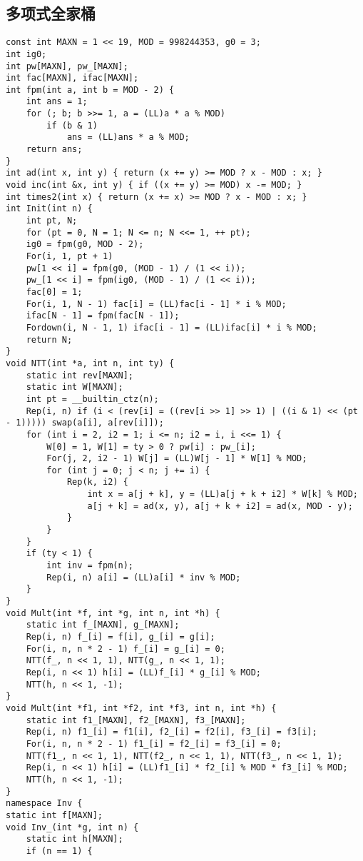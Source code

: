 \documentclass[twocolumn,a4]{article}
\begin{document}
\subsection{多项式全家桶}
\begin{lstlisting}
const int MAXN = 1 << 19, MOD = 998244353, g0 = 3;
int ig0;
int pw[MAXN], pw_[MAXN];
int fac[MAXN], ifac[MAXN];
int fpm(int a, int b = MOD - 2) {
    int ans = 1;
    for (; b; b >>= 1, a = (LL)a * a % MOD)
        if (b & 1)
            ans = (LL)ans * a % MOD;
    return ans;
}
int ad(int x, int y) { return (x += y) >= MOD ? x - MOD : x; }
void inc(int &x, int y) { if ((x += y) >= MOD) x -= MOD; }
int times2(int x) { return (x += x) >= MOD ? x - MOD : x; }
int Init(int n) {
    int pt, N;
    for (pt = 0, N = 1; N <= n; N <<= 1, ++ pt);
    ig0 = fpm(g0, MOD - 2);
    For(i, 1, pt + 1)
    pw[1 << i] = fpm(g0, (MOD - 1) / (1 << i));
	pw_[1 << i] = fpm(ig0, (MOD - 1) / (1 << i));
    fac[0] = 1;
    For(i, 1, N - 1) fac[i] = (LL)fac[i - 1] * i % MOD;
    ifac[N - 1] = fpm(fac[N - 1]);
    Fordown(i, N - 1, 1) ifac[i - 1] = (LL)ifac[i] * i % MOD;
    return N;
}
void NTT(int *a, int n, int ty) {
    static int rev[MAXN];
    static int W[MAXN];
    int pt = __builtin_ctz(n);
    Rep(i, n) if (i < (rev[i] = ((rev[i >> 1] >> 1) | ((i & 1) << (pt - 1))))) swap(a[i], a[rev[i]]);
    for (int i = 2, i2 = 1; i <= n; i2 = i, i <<= 1) {
        W[0] = 1, W[1] = ty > 0 ? pw[i] : pw_[i];
        For(j, 2, i2 - 1) W[j] = (LL)W[j - 1] * W[1] % MOD;
        for (int j = 0; j < n; j += i) {
            Rep(k, i2) {
                int x = a[j + k], y = (LL)a[j + k + i2] * W[k] % MOD;
                a[j + k] = ad(x, y), a[j + k + i2] = ad(x, MOD - y);
            }
        }
    }
    if (ty < 1) {
        int inv = fpm(n);
        Rep(i, n) a[i] = (LL)a[i] * inv % MOD;
    }
}
void Mult(int *f, int *g, int n, int *h) {
    static int f_[MAXN], g_[MAXN];
    Rep(i, n) f_[i] = f[i], g_[i] = g[i];
    For(i, n, n * 2 - 1) f_[i] = g_[i] = 0;
    NTT(f_, n << 1, 1), NTT(g_, n << 1, 1);
    Rep(i, n << 1) h[i] = (LL)f_[i] * g_[i] % MOD;
    NTT(h, n << 1, -1);
}
void Mult(int *f1, int *f2, int *f3, int n, int *h) {
    static int f1_[MAXN], f2_[MAXN], f3_[MAXN];
    Rep(i, n) f1_[i] = f1[i], f2_[i] = f2[i], f3_[i] = f3[i];
    For(i, n, n * 2 - 1) f1_[i] = f2_[i] = f3_[i] = 0;
    NTT(f1_, n << 1, 1), NTT(f2_, n << 1, 1), NTT(f3_, n << 1, 1);
    Rep(i, n << 1) h[i] = (LL)f1_[i] * f2_[i] % MOD * f3_[i] % MOD;
    NTT(h, n << 1, -1);
}
namespace Inv {
static int f[MAXN];
void Inv_(int *g, int n) {
    static int h[MAXN];
    if (n == 1) {

\end{lstlisting}
\end{document}
